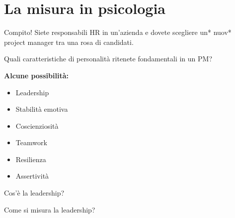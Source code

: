 \documentclass[compress]{beamer}
\begin{document}
\section{La misura in psicologia}

\begin{frame}{}

\begin{block}{Compito!}
Siete responsabili HR in un'azienda e dovete scegliere un* nuov* project manager tra una rosa di candidati. 

Quali caratteristiche di personalità ritenete fondamentali in un PM?
\end{block}

\pause

\textbf{Alcune possibilità:}
\begin{itemize}
    \item Leadership
    \item Stabilità emotiva
    \item Coscienziosità
    \item Teamwork
    \item Resilienza
    \item Assertività
\end{itemize}

\end{frame}


\begin{frame}
\Large
\centering
Cos'è la leadership? 

Come si misura la leadership? 

\end{frame}
\end{document}
